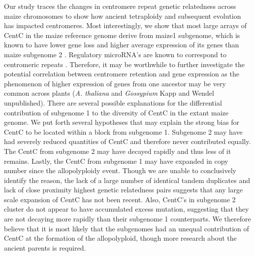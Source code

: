 {%

Our study traces the changes in centromere repeat genetic relatedness across maize chromosomes to show how ancient tetraploidy and subsequent evolution has impacted centromeres.  Most interestingly, we show that most large arrays of CentC in the maize reference genome derive from maize1 subgenome, which is known to have lower gene loss and higher average expression of its genes than maize subgenome 2 \cite{Schnable2011}.  Regulatory microRNA’s are known to correspond to centromeric repeats \citep{ReinhartBartel2002}.  Therefore, it may be worthwhile to further investigate the potential correlation between centromere retention and gene expression as the phenomenon of higher expression of genes from one ancestor may be very common across plants (\emph{A. thaliana} \cite{Cheng2012} and \emph{Gossypium} Kapp and Wendel unpublished).   There are several possible explanations for the differential contribution of subgenome 1 to the diversity of CentC in the extant maize  genome. We put forth several hypotheses that may explain the strong bias for CentC to be located within a block from subgenome 1. Subgenome 2 may have had severely reduced quantities of CentC and therefore never contributed equally.  The CentC from subgenome 2 may have decayed rapidly and thus less of it remains.  Lastly, the CentC from subgenome 1 may have expanded in copy number since the allopolyploidy event.  Though we are unable to conclusively identify the reason, the lack of a large number of identical tandem duplicates  and lack of close proximity highest genetic relatedness pairs suggests that any large scale expansion of CentC has not been recent.  Also, CentC’s in subgenome 2 cluster do not appear to have accumulated excess mutation, suggesting that they are not decaying more rapidly than their subgenome 1 counterparts.  We therefore believe that it is most likely that the subgenomes had an unequal contribution of CentC at the formation of the allopolyploid, though more research about the ancient parents is required.  

}
